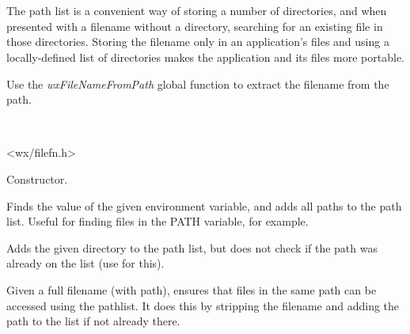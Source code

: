 \section{}\label{wxpathlist}

The path list is a convenient way of storing a number of directories, and
when presented with a filename without a directory, searching for an existing file
in those directories.  Storing the filename only in an application's files and
using a locally-defined list of directories makes the application and its files more
portable.

Use the {\it wxFileNameFromPath} global function to extract the filename
from the path.


\\


<wx/filefn.h>







Constructor.




Finds the value of the given environment variable, and adds all paths
to the path list. Useful for finding files in the PATH variable, for
example.




Adds the given directory to the path list, but does not
check if the path was already on the list (use 
 for this).




Given a full filename (with path), ensures that files in the same path
can be accessed using the pathlist. It does this by stripping the
filename and adding the path to the list if not already there.


